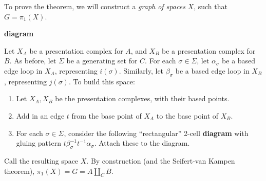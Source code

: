 \documentclass{article}
\begin{document}
\lec


To prove the theorem, we will construct a \emph{graph of spaces} \(X\), such that \(G = \pi_1(X)\).

\textbf{diagram}

Let \(X_A\) be a presentation complex for \(A\), and \(X_B\) be a presentation complex for \(B\). As before, let \(\Sigma\) be a generating set for \(C\). For each \(\sigma \in \Sigma\), let \(\alpha_\sigma\) be a based edge loop in \(X_A\), representing \(i(\sigma)\). Similarly, let \(\beta_\sigma\) be a based edge loop in \(X_B\), representing \(j(\sigma)\). To build this space:

\begin{enumerate}
    \item Let \(X_A, X_B\) be the presentation complexes, with their based points.
    \item Add in an edge \(t\) from the base point of \(X_A\) to the base point of \(X_B\).
    \item For each \(\sigma \in \Sigma\), consider the following ``rectangular'' 2-cell
    \textbf{diagram}
    with gluing pattern \(t\beta_\sigma^{-1}t^{-1}\alpha_\sigma\). Attach these to the diagram.
\end{enumerate}

Call the resulting space \(X\). By construction (and the Seifert-van Kampen theorem), \(\pi_1(X) = G = A \underset{C}\amalg B\).
\end{document}
